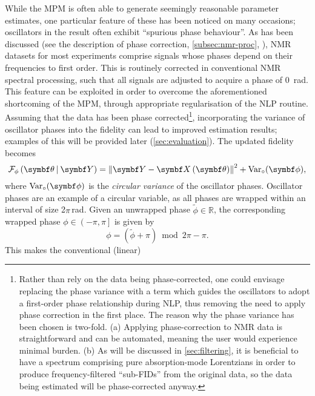 While the \ac{MPM} is often able to generate seemingly reasonable parameter
estimates,
one particular feature of these has been noticed on many occasions;
oscillators in the result often exhibit ``spurious phase behaviour''.
As has been discussed (see the description of phase correction,
\cref{subsec:nmr-proc}, ),
\ac{NMR} datasets for most experiments comprise signals whose phases
depend on their frequencies to first order. This is routinely
corrected in conventional \ac{NMR} spectral processing, such that all signals
are adjusted to acquire a phase of \qty{0}{\radian}. This feature
can be exploited in order to overcome the aforementioned shortcoming of
the \ac{MPM}, through appropriate regularisation of the \ac{NLP} routine.
Assuming that the data has been phase corrected\footnote{
    Rather than rely on the data being phase-corrected, one could envisage
    replacing the phase variance with a term which guides the
    oscillators to adopt a first-order phase relationship during \ac{NLP}, thus
    removing the need to apply phase correction in the first place. The
    reason why the
    phase variance has been chosen is two-fold. (a) Applying phase-correction
    to \ac{NMR} data is straightforward and can be automated,
    meaning the user would experience minimal burden. (b) As will be discussed
    in \cref{sec:filtering}, it is beneficial to have a spectrum comprising
    pure absorption-mode Lorentzians in order to produce frequency-filtered
    ``sub-\acp{FID}'' from the original data, so the data being estimated will
    be phase-corrected anyway.
}, incorporating the variance of oscillator
phases into the fidelity can lead to improved estimation results; examples of
this will be provided later (\cref{sec:evaluation}).
The updated fidelity becomes
\begin{equation}
    \FphithY = \left \lVert \bY - \bXth \right \rVert^2 + \circvar,
    \label{eq:fidelity-phasevar}
\end{equation}
where $\circvar$ is the \emph{circular variance} of the oscillator phases.
Oscillator phases are an example of a circular variable, as all
phases are wrapped within an interval of size 2$\pi$\,\unit{\radian}. Given an
unwrapped phase $\widetilde{\phi} \in \mathbb{R}$, the
corresponding wrapped phase $\phi \in \left( -\pi, \pi \right]$ is given by
\begin{equation}
    \phi = (\widetilde{\phi} + \pi) \bmod 2 \pi - \pi.
    \label{eq:phase_wrap}
\end{equation}
This makes the conventional (linear)

